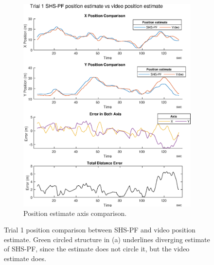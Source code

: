 \begin{figure}[H]
\begin{subfigure}[t]{.45\textwidth}
		\includegraphics[width=\linewidth]{images/20201129_1946_trial_1_traj_1}
		\caption{Position estimate axis comparison.}
		\label{fig:shspf_trial1_comparison}
	\end{subfigure}
	\setlength{\belowcaptionskip}{-10pt}
	\caption{Trial 1 position comparison between SHS-PF and video position estimate. Green circled structure in (a) underlines diverging estimate of SHS-PF, since the estimate does not circle it, but the video estimate does. }
	\label{fig:shspf_trial1_shs_gt_comparison}
\end{figure}
